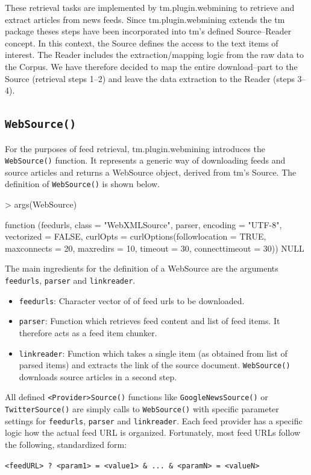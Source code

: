 \documentclass[a4paper]{article}
\newcommand{\class}[1]{\mbox{\textsf{#1}}}
\newcommand{\code}[1]{\mbox{\texttt{#1}}}
\newcommand{\pkg}[1]{{\normalfont\fontseries{b}\selectfont #1}}
\newcommand{\fkt}[1]{\code{#1()}}
\begin{document}
These retrieval tasks are implemented by \pkg{tm.plugin.webmining} to retrieve and extract articles
from news feeds. Since \pkg{tm.plugin.webmining} extends the \pkg{tm} package theses steps
have been incorporated into \pkg{tm}'s defined \class{Source}--\class{Reader} concept.
In this context, the \class{Source} defines the access to the text items of interest.
The \class{Reader} includes the extraction/mapping logic from the raw data to the \class{Corpus}.
We have therefore decided to map the entire download--part to the \class{Source} (retrieval steps 1--2) and leave the
data extraction to the \class{Reader} (steps 3--4).

\subsection{\fkt{WebSource}}
For the purposes of feed retrieval, \pkg{tm.plugin.webmining} introduces the \fkt{WebSource} function.
It represents a generic way of downloading feeds and source articles and returns a \class{WebSource} object,
derived from \pkg{tm}'s \class{Source}. The definition of \fkt{WebSource} is shown below.
\begin{Schunk}
\begin{Sinput}
> args(WebSource)
\end{Sinput}
\begin{Soutput}
function (feedurls, class = "WebXMLSource", parser, encoding = "UTF-8", 
    vectorized = FALSE, curlOpts = curlOptions(followlocation = TRUE, 
        maxconnects = 20, maxredirs = 10, timeout = 30, connecttimeout = 30)) 
NULL
\end{Soutput}
\end{Schunk}
The main ingredients for the definition of a \class{WebSource} are the arguments \code{feedurls},
\code{parser} and \code{linkreader}. 

\begin{itemize}
\item \code{feedurls}: Character vector of of feed urls to be downloaded.
\item \code{parser}: Function which retrieves feed content and list of feed items. It therefore acts
as a feed item chunker.
\item \code{linkreader}: Function which takes a single item (as obtained from list of parsed items) and
extracts the link of the source document. \fkt{WebSource} downloads source articles in a second step.
\end{itemize}
All defined \fkt{<Provider>Source} functions like \fkt{GoogleNewsSource} or \fkt{TwitterSource} are simply calls to
\fkt{WebSource} with specific parameter settings for \code{feedurls}, \code{parser} and \code{linkreader}.
Each feed provider has a specific logic how the actual feed URL is organized. Fortunately, most feed URLs
follow the following, standardized form:
\begin{center}
\code{<feedURL> ? <param1> = <value1> \& ... \& <paramN> = <valueN>}
\end{center}
\end{document}
